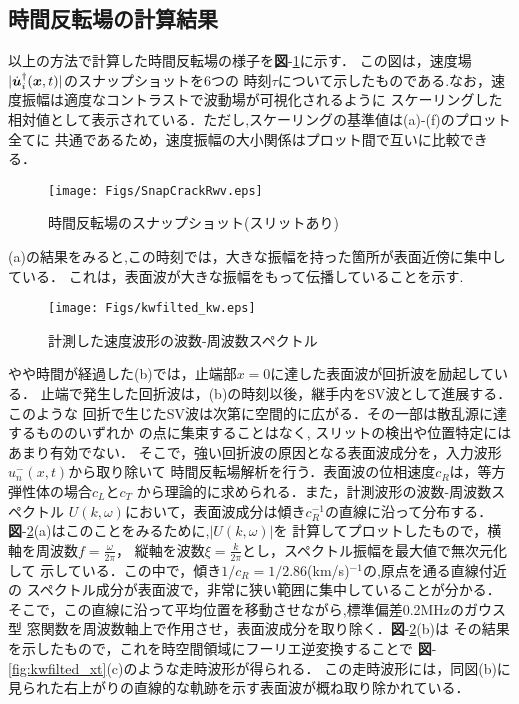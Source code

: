 \subsection{時間反転場の計算結果}
以上の方法で計算した時間反転場の様子を{\bf 図}-\ref{fig:snap_crack_rwv}に示す．
この図は，速度場$| \dot{\boldsymbol{u}}_i^{\dagger}(\boldsymbol{x},t)|$のスナップショットを6つの
時刻$\tau$について示したものである.なお，速度振幅は適度なコントラストで波動場が可視化されるように
スケーリングした相対値として表示されている．ただし,スケーリングの基準値は(a)-(f)のプロット全てに
共通であるため，速度振幅の大小関係はプロット間で互いに比較できる．
\begin{figure}[bth]
\centering
	\texttt{[image: Figs/SnapCrackRwv.eps]}
	\caption{時間反転場のスナップショット(スリットあり)}
	\label{fig:snap_crack_rwv}
\end{figure}
(a)の結果をみると,この時刻では，大きな振幅を持った箇所が表面近傍に集中している．
これは，表面波が大きな振幅をもって伝播していることを示す.
\begin{figure}[t]
\centering
	\texttt{[image: Figs/kwfilted\_kw.eps]}
	\caption{計測した速度波形の波数-周波数スペクトル}
	\label{fig:kwfilted_kw}
\end{figure}
やや時間が経過した(b)では，止端部$x=0$に達した表面波が回折波を励起している．
止端で発生した回折波は，(b)の時刻以後，継手内をSV波として進展する．このような
回折で生じたSV波は次第に空間的に広がる．その一部は散乱源に達するもののいずれか
の点に集束することはなく, スリットの検出や位置特定にはあまり有効でない．
%
そこで，強い回折波の原因となる表面波成分を，入力波形$u_n^{-}(x,t)$から取り除いて
時間反転場解析を行う．表面波の位相速度$c_R$は，等方弾性体の場合$c_L$と$c_T$
から理論的に求められる\cite{Schmerr1999}．また，計測波形の波数-周波数スペクトル
$U(k,\omega)$において，表面波成分は傾き$c_R^{-1}$の直線に沿って分布する．
{\bf 図}-\ref{fig:kwfilted_kw}(a)はこのことをみるために,$|U(k,\omega)|$を
計算してプロットしたもので，横軸を周波数$f=\frac{\omega}{2\pi}$，
縦軸を波数$\xi=\frac{k}{2\pi}$とし，スペクトル振幅を最大値で無次元化して
示している．この中で，傾き$1/c_R=1/2.86$(km/s)$^{-1}$の,原点を通る直線付近の
スペクトル成分が表面波で，非常に狭い範囲に集中していることが分かる．
そこで，この直線に沿って平均位置を移動させながら,標準偏差0.2MHzのガウス型
窓関数を周波数軸上で作用させ，表面波成分を取り除く．{\bf 図}-\ref{fig:kwfilted_kw}(b)は
その結果を示したもので，これを時空間領域にフーリエ逆変換することで
{\bf 図}-\ref{fig:kwfilted_xt}(c)のような走時波形が得られる．
この走時波形には，同図(b)に見られた右上がりの直線的な軌跡を示す表面波が概ね取り除かれている．
